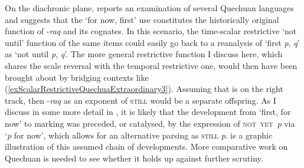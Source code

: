 On the diachronic plane, \textcite[90–91]{vanBaar1997} reports an examination of several Quechuan languages and suggests that the \lq for now, first\rq{ }use constitutes the historically original function of \mbox{-\textit{raq}} and its cognates. In this scenario, the  time-scalar restrictive \lq not until\rq{ }function of the same items could easily go back to a reanalysis of \lq first \textit{p}, \textit{q}' as \lq not until \textit{p}, \textit{q}'. The more general restrictive function I discuss here, which shares the scale reversal with the temporal restrictive one, would then have been brought about by bridging contexts like (\ref{exScalarRestrictiveQuechuaExtraordinary3}). Assuming that \citeauthor{vanBaar1997} is on the right track, then \mbox{-\textit{raq}} as an exponent of \textsc{still} would be a separate offspring. As I discuss in some more detail in , it is likely that the development from \lq first, for now\rq{ }to marking  was preceded, or catalysed, by the expression of \mbox{\textsc{not yet} \textit{p}} via \lq \mbox{\neg{}\textit{p}} for now\rq{}, which allows for an alternative parsing as \textsc{still} \mbox{\neg{}\textit{p}}.  is a graphic illustration of this assumed chain of developments. More comparative work on Quechuan is needed to see whether it holds up against further scrutiny.
\setlength{\MinimumHeight}{1.5cm}
